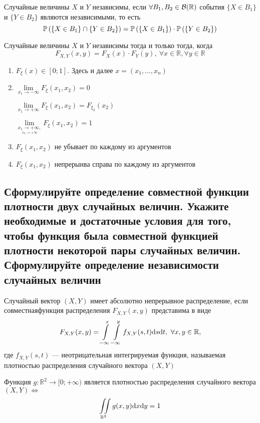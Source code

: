 \documentclass{article}
\begin{document}
 Случайные величины $X$ и $Y$ независимы, если $\forall B_1,B_2\in\mathcal{B}(\mathbb{R})$ события $\{X\in B_1\}$ и $\{Y\in B_2\}$ являются независимыми, то есть
\begin{equation*}
    \mathbb{P}\left(\{X\in B_1\}\cap\{Y\in B_2\}\right)=\mathbb{P}\left(\{X\in B_1\}\right)\cdot\mathbb{P}\left(\{Y\in B_2\}\right)
\end{equation*}

\theorem Случайные величины $X$ и $Y$ независимы тогда и только тогда, когда
\begin{equation*}
    F_{X,Y}(x,y)=F_{X}(x)\cdot F_{Y}(y),\ \forall x\in\mathbb{R},\forall y\in\mathbb{R}
\end{equation*}

\theorem
\begin{enumerate}
    \item $F_{\xi}(x)\in[0;1]$. Здесь и далее $x=(x_1,\ldots,x_n)$
    \item $\lim\limits_{x_1\rightarrow-\infty}F_{\xi}(x_1,x_2)=0$
    
    $\lim\limits_{x_1\rightarrow+\infty}F_{\xi}(x_1,x_2)=F_{\xi_2}(x_2)$

    $\lim\limits_{\underset{x_2\rightarrow+\infty}{x_1\rightarrow+\infty,}}F_{\xi}(x_1,x_2)=1$
    \item $F_{\xi}(x_1,x_2)$ не убывает по каждому из аргументов
    \item $F_{\xi}(x_1,x_2)$ непрерынва справа по каждому из аргументов
\end{enumerate}

\subsection{Сформулируйте определение совместной функции плотности двух случайных величин. Укажите необходимые и достаточные условия для того, чтобы функция была совместной функцией плотности некоторой пары случайных величин. Сформулируйте определение независимости случайных величин}
 Случайный вектор $(X,Y)$ имеет абсолютно непрерывное распределение, если совместнаяфункция распределения $F_{X,Y}(x,y)$ представима в виде
\begin{equation*}
    F_{X,Y}(x,y)=\int\limits_{-\infty}^{x}\int\limits_{-\infty}^{y} f_{X,Y}(s,t)\text{d}s\text{d}t,\ \forall x,y\in\mathbb{R},
\end{equation*}
где $f_{X,Y}(s,t)$ — неотрицательная интегрируемая функция, называемая плотностью распределения случайного вектора $(X,Y)$

\theorem Функция $g:\mathbb{R}^2\to[0;+\infty)$ является плотностью распределения случайного вектора $(X,Y)\Longleftrightarrow$
\begin{equation*}
    \iint\limits_{\mathbb{R}^2}g(x,y)\text{d}x\text{d}y=1
\end{equation*} 
\end{document}
